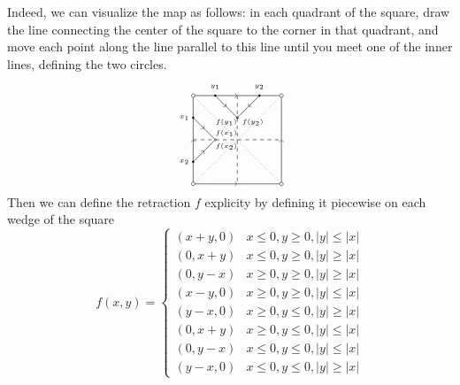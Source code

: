 \documentclass{article}
\begin{document}
Indeed, we can visualize the map as follows: in each quadrant of the
square, draw the line connecting the center of the square to the
corner in that quadrant, and move each point along the line parallel
to this line until you meet one of the inner lines, defining the
two circles.
\[
\begin{tikzpicture}[scale=1.25]
  \node[draw,circle,inner sep=1pt,fill=none] (TL) at (-1,1) {};
  \node[draw,circle,inner sep=1pt,fill=none] (BL) at (-1,-1) {};
  \node[draw,circle,inner sep=1pt,fill=none] (TR) at (1,1) {};
  \node[draw,circle,inner sep=1pt,fill=none] (BR) at (1,-1) {};
  \draw[->] (TL) -- (0,1);
  \draw (0,1) -- (TR);
  \draw (TR) -- (1,0);
  \draw[->] (BR) -- (1,0);
  \draw[->] (BL) -- (0,-1);
  \draw (0,-1) -- (BR);
  \draw[->] (BL) -- (-1,0);
  \draw (TL) -- (-1,0);
  \draw[dashed] (0,1) -- (0,-1);
  \draw[dashed] (-1,0) -- (1,0);
  \draw[dotted] (TR) -- (0,0);
  \draw[dotted] (TL) -- (0,0);
  \draw[dotted] (BR) -- (0,0);
  \draw[dotted] (BL) -- (0,0);
  \node (XL) at (-1.2,.5) {\tiny{$x_1$}};
  \node[draw,circle,inner sep=.5pt,fill] (X) at (-1,.5) {};
  \node (FXL) at (-.25,.15) {\tiny{$f(x_1)$}};
  \node[draw,circle,inner sep=.5pt,fill=none] (FX) at (-.5,0) {};
  \draw[->] (X) -- (-.75,.25);
  \draw[] (-.75,.25) -- (FX);
  \node (YL) at (-1.2,-.5) {\tiny{$x_2$}};
  \node[draw,circle,inner sep=.5pt,fill] (Y) at (-1,-.5) {};
  \node (FYL) at (-.25,-.15) {\tiny{$f(x_2)$}};
  \draw[->] (Y) -- (-.75,-.25);
  \draw[] (-.75,-.25) -- (FX);
  \node (Y1L) at (-.5,1.2) {\tiny{$y_1$}};
  \node[draw,circle,inner sep=.5pt,fill] (Y1) at (-.5,1) {};
  \node (FY) at (-.25,.4) {\tiny{$f(y_1)$}};
  \node[draw,circle,inner sep=.5pt,fill=none] (FY) at (0,.5) {};
  \draw[->] (Y1) -- (-.25,.75);
  \draw[] (-.25,.75) -- (FY);
  \node (Y2L) at (.5,1.2) {\tiny{$y_2$}};
  \node[draw,circle,inner sep=.5pt,fill] (Y2) at (.5,1) {};
  \node (FY) at (.35,.4) {\tiny{$f(y_2)$}};
  \node[draw,circle,inner sep=.5pt,fill=none] (FY) at (0,.5) {};
  \draw[->] (Y2) -- (.25,.75);
  \draw[] (.25,.75) -- (FY);
\end{tikzpicture}
\]
Then we can define the retraction $f$ explicity by defining it
piecewise on each wedge of the square
\[
f(x, y) =
\begin{cases}
  (x + y, 0) & x \leq 0, y \geq 0, |y| \leq |x| \\
  (0, x + y) & x \leq 0, y \geq 0, |y| \geq |x| \\
  (0, y - x) & x \geq 0, y \geq 0, |y| \geq |x| \\
  (x - y, 0) & x \geq 0, y \geq 0, |y| \leq |x| \\
  (y - x, 0) & x \geq 0, y \leq 0, |y| \geq |x| \\
  (0, x + y) & x \geq 0, y \leq 0, |y| \leq |x| \\
  (0, y - x) & x \leq 0, y \leq 0, |y| \leq |x| \\
  (y - x, 0) & x \leq 0, y \leq 0, |y| \geq |x|
\end{cases}
\]
\end{document}
